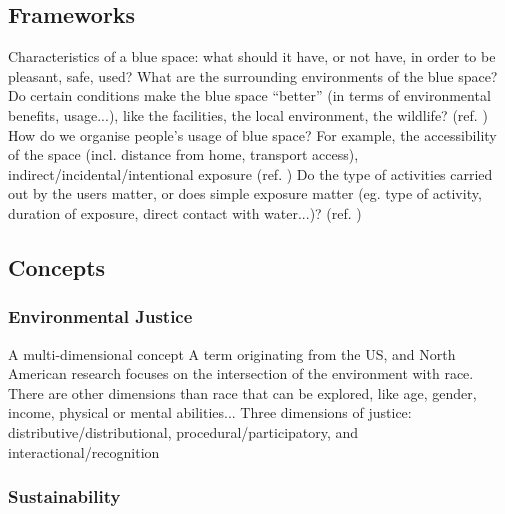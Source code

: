 \documentclass{article}
\begin{document}
\subsection{Frameworks}

\begin{outline}
	\1 Characteristics of a blue space: what should it have, or not have, in order to be pleasant, safe, used? \parencite{}
	\1 What are the surrounding environments of the blue space? Do certain conditions make the blue space ``better'' (in terms of environmental benefits, usage...), like the facilities, the local environment, the wildlife? (ref. \parencite{garrett2019urban})
	\1 How do we organise people's usage of blue space? For example, the accessibility of the space (incl. distance from home, transport access), indirect/incidental/intentional exposure (ref. \parencite{garrett2019urban})
	\1 Do the type of activities carried out by the users matter, or does simple exposure matter (eg. type of activity, duration of exposure, direct contact with water...)? (ref. \parencite{garrett2019urban})
\end{outline}



\subsection{Concepts}

\subsubsection{Environmental Justice}

\begin{outline}
	\1 A multi-dimensional concept
	\1 A term originating from the US, and North American research focuses on the intersection of the environment with race. There are other dimensions than race that can be explored, like age, gender, income, physical or mental abilities...
	\1 Three dimensions of justice: distributive/distributional, procedural/participatory, and interactional/recognition \parencite{kronenberg2020environmental}
\end{outline}

\subsubsection{Sustainability}
\end{document}
